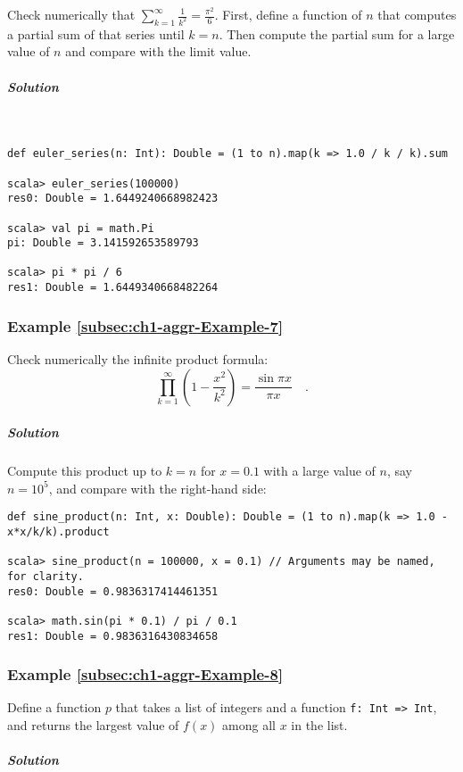Check numerically that $\sum_{k=1}^{\infty}\frac{1}{k^{2}}=\frac{\pi^{2}}{6}$.
First, define a function of $n$ that computes a partial sum of that
series until $k=n$. Then compute the partial sum for a large value
of $n$ and compare with the limit value.

\subparagraph{Solution}

~

\begin{lstlisting}
def euler_series(n: Int): Double = (1 to n).map(k => 1.0 / k / k).sum

scala> euler_series(100000)
res0: Double = 1.6449240668982423

scala> val pi = math.Pi
pi: Double = 3.141592653589793

scala> pi * pi / 6
res1: Double = 1.6449340668482264 
\end{lstlisting}


\subsubsection{Example \label{subsec:ch1-aggr-Example-7}\ref{subsec:ch1-aggr-Example-7}}

Check numerically the infinite product formula:
\[
\prod_{k=1}^{\infty}\left(1-\frac{x^{2}}{k^{2}}\right)=\frac{\sin\pi x}{\pi x}\quad.
\]


\subparagraph{Solution}

Compute this product up to $k=n$ for $x=0.1$ with a large value
of $n$, say $n=10^{5}$, and compare with the right-hand side:
\begin{lstlisting}
def sine_product(n: Int, x: Double): Double = (1 to n).map(k => 1.0 - x*x/k/k).product

scala> sine_product(n = 100000, x = 0.1) // Arguments may be named, for clarity.
res0: Double = 0.9836317414461351

scala> math.sin(pi * 0.1) / pi / 0.1
res1: Double = 0.9836316430834658
\end{lstlisting}


\subsubsection{Example \label{subsec:ch1-aggr-Example-8}\ref{subsec:ch1-aggr-Example-8}}

Define a function $p$ that takes a list of integers and a function
\lstinline!f: Int => Int!, and returns the largest value of $f(x)$
among all $x$ in the list.

\subparagraph{Solution}


